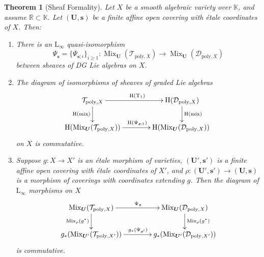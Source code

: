 \documentclass[a4paper, 10pt]{amsart}
\newtheorem{thm}[equation]{Theorem}
\theoremstyle{definition}
\numberwithin{equation}{section}
\newcommand{\opn}{\operatorname}
\newcommand{\mcal}[1]{\mathcal{#1}}
\newcommand{\mrm}[1]{\mathrm{#1}}
\newcommand{\mbb}[1]{\mathbb{#1}}
\newcommand{\tup}[1]{\textup{#1}}
\newcommand{\bsym}[1]{\boldsymbol{#1}}
\newcommand{\K}{\mbb{K}}
\newcommand{\R}{\mbb{R}}
\begin{document}
\begin{thm}[Sheaf Formality] \label{thm:13}
Let $X$ be a smooth algebraic variety over $\K$, and assume $\R
\subset \K$. Let $(\bsym{U}, \bsym{s})$ be a finite affine open covering with
\'etale coordinates of $X$. Then\tup{:}
\begin{enumerate}
\item There is an $\mrm{L}_{\infty}$ quasi-isomorphism
\[ \Psi_{\bsym{s}} = \{ \Psi_{\bsym{s}; i} \}_{i \geq 1} :
\opn{Mix}_{\bsym{U}}(\mcal{T}_{\mrm{poly}, X}) \to 
\opn{Mix}_{\bsym{U}}(\mcal{D}_{\mrm{poly}, X})  \]
between sheaves of DG Lie algebras on $X$. 
%
\item The diagram of isomorphisms of sheaves of graded Lie algebras 
\[ \UseTips \xymatrix @C=9ex @R=5ex {
\mcal{T}_{\mrm{poly}, X}
\ar[r]^{\mrm{H}(\Upsilon_1)}
\ar[d]_{\mrm{H}(\opn{mix})}
&
\mrm{H} (\mcal{D}_{\mrm{poly}, X})
\ar[d]^{\mrm{H}(\opn{mix})}
\\
\mrm{H} (\opn{Mix}_{\bsym{U}}(\mcal{T}_{\mrm{poly}, X}))
\ar[r]^{\mrm{H}(\Psi_{\bsym{s}; 1})}
&
\mrm{H} (\opn{Mix}_{\bsym{U}}(\mcal{D}_{\mrm{poly}, X})) \ 
} \]
on $X$ is commutative.
%
\item Suppose $g : X \to X'$ is an \'etale morphism of varieties, 
$(\bsym{U}', \bsym{s}')$ is a finite affine open covering with \'etale
coordinates of $X'$, and 
$\rho : (\bsym{U}', \bsym{s}') \to (\bsym{U}, \bsym{s})$
is a morphism of coverings with coordinates extending $g$.
Then the diagram of $\mrm{L}_{\infty}$ morphisms on $X$
\[ \UseTips \xymatrix @C=9ex @R=5ex {
\opn{Mix}_{\bsym{U}}(\mcal{T}_{\mrm{poly}, X})
\ar[r]^{\Psi_{\bsym{s}}}
\ar[d]_{\opn{Mix}_{\rho}(g^*)}
&
\opn{Mix}_{\bsym{U}}(\mcal{D}_{\mrm{poly}, X})
\ar[d]^{\opn{Mix}_{\rho}(g^*)}
\\
g_* (\opn{Mix}_{\bsym{U}'}(\mcal{T}_{\mrm{poly}, X'}))
\ar[r]^{g_*(\Psi_{\bsym{s}'})}
&
g_* (\opn{Mix}_{\bsym{U}'}(\mcal{D}_{\mrm{poly}, X'}))
} \]
is commutative. 
\end{enumerate} 
\end{thm}
\end{document}
